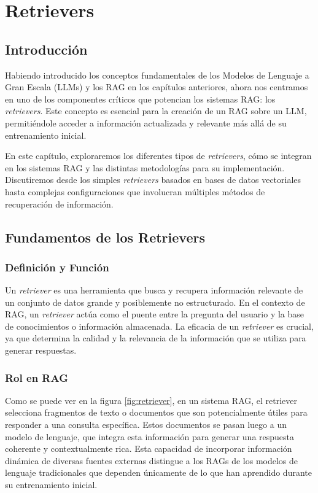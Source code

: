 
\cleardoublepage

\chapter{Retrievers}

\section{Introducción}

Habiendo introducido los conceptos fundamentales de los Modelos de Lenguaje a Gran Escala (LLMs) y los RAG en los capítulos anteriores, ahora nos centramos en uno de los componentes críticos que potencian los sistemas RAG: los \textit{retrievers}. Este concepto es esencial para la creación de un RAG sobre un LLM, permitiéndole acceder a información actualizada y relevante más allá de su entrenamiento inicial.

En este capítulo, exploraremos los diferentes tipos de \textit{retrievers}, cómo se integran en los sistemas RAG y las distintas metodologías para su implementación. Discutiremos desde los simples \textit{retrievers} basados en bases de datos vectoriales hasta complejas configuraciones que involucran múltiples métodos de recuperación de información.

\section{Fundamentos de los Retrievers}

\subsection{Definición y Función}

Un \textit{retriever} es una herramienta que busca y recupera información relevante de un conjunto de datos grande y posiblemente no estructurado. En el contexto de RAG, un \textit{retriever} actúa como el puente entre la pregunta del usuario y la base de conocimientos o información almacenada. La eficacia de un \textit{retriever} es crucial, ya que determina la calidad y la relevancia de la información que se utiliza para generar respuestas.

\subsection{Rol en RAG}

Como se puede ver en la figura \ref{fig:retriever}, en un sistema RAG, el retriever selecciona fragmentos de texto o documentos que son potencialmente útiles para responder a una consulta específica. Estos documentos se pasan luego a un modelo de lenguaje, que integra esta información para generar una respuesta coherente y contextualmente rica. Esta capacidad de incorporar información dinámica de diversas fuentes externas distingue a los RAGs de los modelos de lenguaje tradicionales que dependen únicamente de lo que han aprendido durante su entrenamiento inicial.

